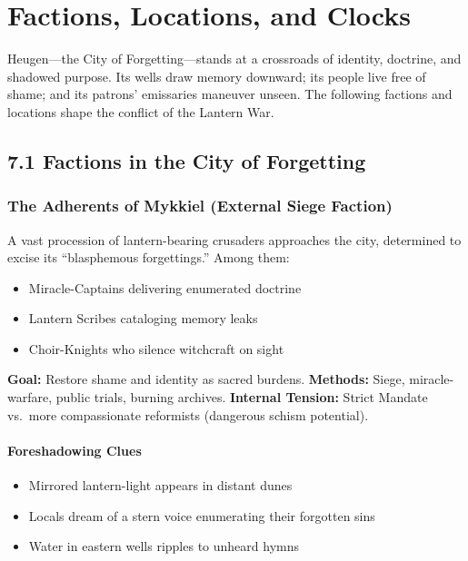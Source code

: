\documentclass[11pt]{book}
\begin{document}
\section{Factions, Locations, and Clocks}

Heugen---the City of Forgetting---stands at a crossroads of identity, doctrine,
and shadowed purpose. Its wells draw memory downward; its people live free
of shame; and its patrons' emissaries maneuver unseen. The following factions
and locations shape the conflict of the Lantern War.

\subsection{7.1 Factions in the City of Forgetting}

\subsubsection*{The Adherents of Mykkiel (External Siege Faction)}

A vast procession of lantern-bearing crusaders approaches the city,
determined to excise its ``blasphemous forgettings.''  
Among them:
\begin{itemize}[leftmargin=*]
    \item Miracle-Captains delivering enumerated doctrine
    \item Lantern Scribes cataloging memory leaks
    \item Choir-Knights who silence witchcraft on sight
\end{itemize}

\textbf{Goal:} Restore shame and identity as sacred burdens.  
\textbf{Methods:} Siege, miracle-warfare, public trials, burning archives.  
\textbf{Internal Tension:}  
Strict Mandate vs.\ more compassionate reformists (dangerous schism potential).

\paragraph{Foreshadowing Clues}
\begin{itemize}[leftmargin=*]
    \item Mirrored lantern-light appears in distant dunes
    \item Locals dream of a stern voice enumerating their forgotten sins
    \item Water in eastern wells ripples to unheard hymns
\end{itemize}
\end{document}
